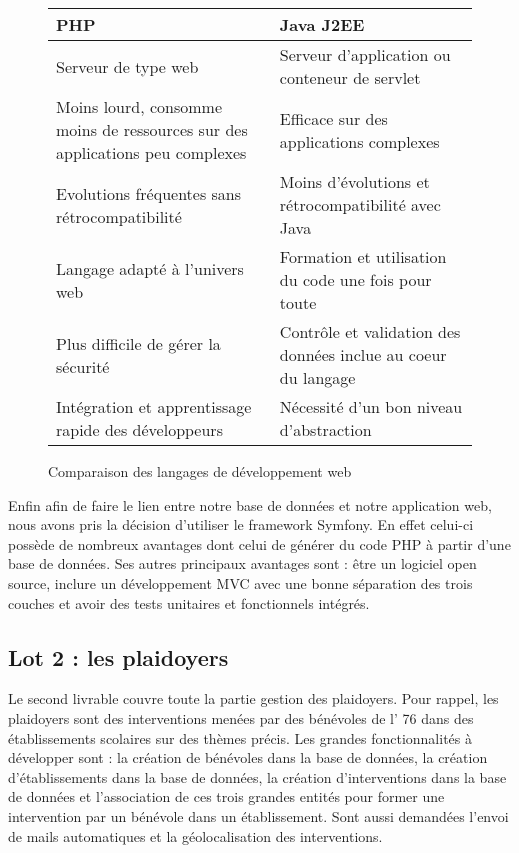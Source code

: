 \documentclass[asi]{picInsa}
\begin{document}
\begin{figure}[!h]
\begin{center}
    \begin{tabular}[h]{|p{}|p{}|}
    
	\hline
	\cellcolor{blue!15}PHP & \cellcolor{blue!15}Java J2EE \\\hline
        Serveur de type web & Serveur d'application ou conteneur de servlet \\\hline
        Moins lourd, consomme moins de ressources sur des applications peu complexes & Efficace sur des applications complexes \\\hline
        Evolutions fréquentes sans rétrocompatibilité & Moins d'évolutions et rétrocompatibilité avec Java \\\hline
        Langage adapté à l'univers web & Formation et utilisation du code une fois pour toute \\\hline
        Plus difficile de gérer la sécurité & Contrôle et validation des données inclue au coeur du langage \\\hline
        Intégration et apprentissage rapide des développeurs & Nécessité d'un bon niveau d'abstraction \\\hline
    \end{tabular}
    \caption{Comparaison des langages de développement web}
    \label{comparaison_PHP}
\end{center}
\end{figure}

Enfin afin de faire le lien entre notre base de données et notre application web, nous avons pris la décision d'utiliser le framework Symfony. En effet celui-ci possède de nombreux avantages dont celui de générer du code PHP à partir d'une base de données. Ses autres principaux avantages sont : être un logiciel open source, inclure un développement MVC avec une bonne séparation des trois couches et avoir des tests unitaires et fonctionnels intégrés.

\subsection{Lot 2 : les plaidoyers}
Le second livrable couvre toute la partie gestion des plaidoyers. Pour rappel, les plaidoyers sont des interventions menées par des bénévoles de l'\nomClient{} 76 dans des établissements scolaires sur des thèmes précis. Les grandes fonctionnalités à développer sont : la création de bénévoles dans la base de données, la création d'établissements dans la base de données, la création d'interventions dans la base de données et l'association de ces trois grandes entités pour former une intervention par un bénévole dans un établissement. Sont aussi demandées l'envoi de mails automatiques et la géolocalisation des interventions.
\end{document}
